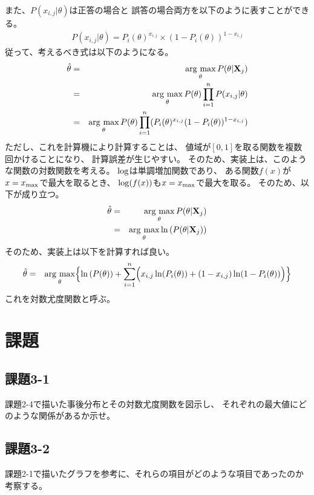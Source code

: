 \documentclass[12pt]{jarticle}
\begin{document}
また、$P(x_{i,j}|\theta)$は正答の場合と
誤答の場合両方を以下のように表すことができる。
\begin{eqnarray}
    P(x_{i,j}|\theta)=P_i(\theta)^{x_{i,j}}\times (1-P_i(\theta))^{1-x_{i,j}}
\end{eqnarray}
従って、考えるべき式は以下のようになる。
\begin{eqnarray}
    \hat{\theta}&=& \mathop{\rm arg~max}\limits_{\theta} P(\theta|{\bf X}_j) \nonumber\\
    &=& \mathop{\rm arg~max}\limits_{\theta} P(\theta)\prod_{i=1}^n P(x_{i,j}|\theta) \nonumber\\
    &=& \mathop{\rm arg~max}\limits_{\theta} P(\theta)\prod_{i=1}^n (P_i(\theta)^{x_{i,j}}(1-P_i(\theta))^{1-x_{i,j}})
\end{eqnarray}
ただし、これを計算機により計算することは、
値域が$[0,1]$を取る関数を複数回かけることになり、
計算誤差が生じやすい。
そのため、実装上は、このような関数の対数関数を考える。
${\rm log}$は単調増加関数であり、
ある関数$f(x)$が$x=x_{\rm max}$で最大を取るとき、
${\rm log}(f(x))$も$x=x_{\rm max}$で最大を取る。
そのため、以下が成り立つ。
\begin{eqnarray}
    \hat{\theta}&=& \mathop{\rm arg~max}\limits_{\theta} P(\theta|{\bf X}_j)\\
    &=& \mathop{\rm arg~max}\limits_{\theta} \ln{(P(\theta|{\bf X}_j))}
\end{eqnarray}
そのため、実装上は以下を計算すれば良い。
\begin{eqnarray}
    \hat{\theta}&=& \mathop{\rm arg~max}\limits_{\theta} \Bigl\{\ln{(P(\theta))
    +\sum_{i=1}^n \Bigl(x_{i,j}\ln(P_i(\theta))+(1-x_{i,j})\ln(1-P_i(\theta))\Bigr)}\Bigr\}
\end{eqnarray}
これを対数尤度関数と呼ぶ。

\section{課題}
\subsection{課題3-1}
\begin{shadebox}
    課題2-4で描いた事後分布とその対数尤度関数を図示し、
    それぞれの最大値にどのような関係があるか示せ。
\end{shadebox}

\subsection{課題3-2}
\begin{shadebox}
    課題2-1で描いたグラフを参考に、それらの項目がどのような項目であったのか考察する。
\end{shadebox}
\end{document}

